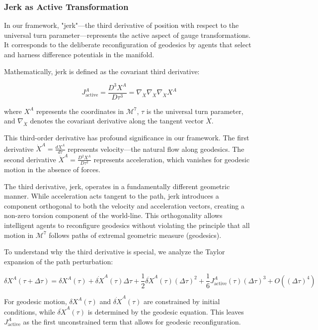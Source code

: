 \documentclass{article}
\begin{document}
\subsubsection{Jerk as Active Transformation}

In our framework, "jerk"—the third derivative of position with respect to the universal turn parameter—represents the active aspect of gauge transformations. It corresponds to the deliberate reconfiguration of geodesics by agents that select and harness difference potentials in the manifold.

Mathematically, jerk is defined as the covariant third derivative:

\begin{equation}
J^A_{\text{active}} = \frac{D^3 X^A}{D\tau^3} = \nabla_{\dot{X}} \nabla_{\dot{X}} \nabla_{\dot{X}} X^A
\end{equation}

where $X^A$ represents the coordinates in $\mathcal{M}^7$, $\tau$ is the universal turn parameter, and $\nabla_{\dot{X}}$ denotes the covariant derivative along the tangent vector $\dot{X}$.

This third-order derivative has profound significance in our framework. The first derivative $\dot{X}^A = \frac{dX^A}{d\tau}$ represents velocity—the natural flow along geodesics. The second derivative $\ddot{X}^A = \frac{D^2 X^A}{D\tau^2}$ represents acceleration, which vanishes for geodesic motion in the absence of forces. 

The third derivative, jerk, operates in a fundamentally different geometric manner. While acceleration acts tangent to the path, jerk introduces a component orthogonal to both the velocity and acceleration vectors, creating a non-zero torsion component of the world-line. This orthogonality allows intelligent agents to reconfigure geodesics without violating the principle that all motion in $\mathcal{M}^7$ follows paths of extremal geometric measure (geodesics).

To understand why the third derivative is special, we analyze the Taylor expansion of the path perturbation:

\begin{equation}
\delta X^A(\tau + \Delta\tau) = \delta X^A(\tau) + \dot{\delta X}^A(\tau)\Delta\tau + \frac{1}{2}\ddot{\delta X}^A(\tau)(\Delta\tau)^2 + \frac{1}{6}J^A_{\text{active}}(\tau)(\Delta\tau)^3 + O((\Delta\tau)^4)
\end{equation}

For geodesic motion, $\delta X^A(\tau)$ and $\dot{\delta X}^A(\tau)$ are constrained by initial conditions, while $\ddot{\delta X}^A(\tau)$ is determined by the geodesic equation. This leaves $J^A_{\text{active}}$ as the first unconstrained term that allows for geodesic reconfiguration.
\end{document}
